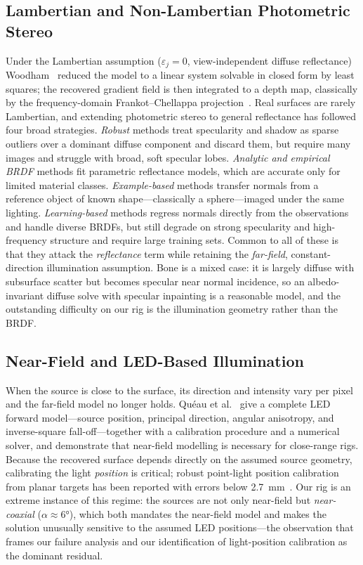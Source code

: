 \documentclass[journal]{IEEEtran}
\begin{document}
\subsection{Lambertian and Non-Lambertian Photometric Stereo}
Under the Lambertian assumption ($\varepsilon_j{=}0$, view-independent diffuse
reflectance) Woodham~\cite{woodham} reduced the model to a linear system solvable in
closed form by least squares; the recovered gradient field is then integrated to a
depth map, classically by the frequency-domain Frankot--Chellappa
projection~\cite{fc}. Real surfaces are rarely Lambertian, and extending photometric
stereo to general reflectance has followed four broad strategies. \emph{Robust}
methods treat specularity and shadow as sparse outliers over a dominant diffuse
component and discard them, but require many images and struggle with broad, soft
specular lobes. \emph{Analytic and empirical BRDF} methods fit parametric reflectance
models, which are accurate only for limited material classes. \emph{Example-based}
methods transfer normals from a reference object of known shape---classically a
sphere---imaged under the same lighting. \emph{Learning-based} methods regress normals
directly from the observations and handle diverse BRDFs, but still degrade on strong
specularity and high-frequency structure and require large training sets. Common to
all of these is that they attack the \emph{reflectance} term while retaining the
\emph{far-field}, constant-direction illumination assumption. Bone is a mixed case: it
is largely diffuse with subsurface scatter but becomes specular near normal incidence,
so an albedo-invariant diffuse solve with specular inpainting is a reasonable model,
and the outstanding difficulty on our rig is the illumination geometry rather than the
BRDF.

\subsection{Near-Field and LED-Based Illumination}
When the source is close to the surface, its direction and intensity vary per pixel
and the far-field model no longer holds. Qu\'eau et al.~\cite{queau} give a complete
LED forward model---source position, principal direction, angular anisotropy, and
inverse-square fall-off---together with a calibration procedure and a numerical solver,
and demonstrate that near-field modelling is necessary for close-range rigs. Because
the recovered surface depends directly on the assumed source geometry, calibrating the
light \emph{position} is critical; robust point-light position calibration from planar
targets has been reported with errors below \SI{2.7}{\milli\meter}~\cite{aocalib}. Our
rig is an extreme instance of this regime: the sources are not only near-field but
\emph{near-coaxial} ($\alpha\approx\ang{6}$), which both mandates the near-field model
and makes the solution unusually sensitive to the assumed LED positions---the
observation that frames our failure analysis and our identification of light-position
calibration as the dominant residual.
\end{document}
